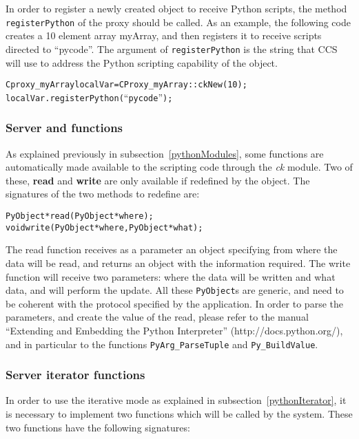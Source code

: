 In order to register a newly created object to receive Python scripts, the
method \texttt{registerPython} of the proxy should be called. As an example,
the following code creates a 10 element array myArray, and then registers it to
receive scripts directed to ``pycode''. The argument of \texttt{registerPython}
is the string that CCS will use to address the Python scripting capability of
the object.

\begin{alltt}
Cproxy_myArray localVar = CProxy_myArray::ckNew(10);
localVar.registerPython(``pycode'');
\end{alltt}


\subsubsection{Server  and  functions}

\label{pythonServerRW}

As explained previously in subsection~\ref{pythonModules}, some functions are
automatically made available to the scripting code through the {\em ck} module.
Two of these, \textbf{read} and \textbf{write} are only available if redefined
by the object. The signatures of the two methods to redefine are:

\begin{alltt}
PyObject* read(PyObject* where);
void write(PyObject* where, PyObject* what);
\end{alltt}

The read function receives as a parameter an object specifying from where the data
will be read, and returns an object with the information required. The write
function will receive two parameters: where the data will be written and what
data, and will perform the update. All these \texttt{PyObject}s are generic, and
need to be coherent with the protocol specified by the application. In order to
parse the parameters, and create the value of the read, please refer to the
manual ``Extending and Embedding the Python Interpreter''
(http://docs.python.org/), and in particular to the functions
\texttt{PyArg\_ParseTuple} and \texttt{Py\_BuildValue}.

\subsubsection{Server iterator functions}

\label{pythonServerIterator}

In order to use the iterative mode as explained in
subsection~\ref{pythonIterator}, it is necessary to implement two functions
which will be called by the system. These two functions have the following
signatures:

